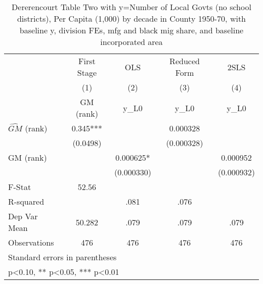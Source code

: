 \begin{table}[htbp]\centering
\def\sym#1{\ifmmode^{#1}\else\(^{#1}\)\fi}
\caption{Dererencourt Table Two with y=Number of Local Govts (no school districts), Per Capita (1,000) by decade in County 1950-70, with baseline y, division FEs, mfg and black mig share, and baseline incorporated area}
\begin{tabular}{l*{4}{c}}
\toprule
                    & First Stage   &         OLS   &Reduced Form   &        2SLS   \\
                    &\multicolumn{1}{c}{(1)}&\multicolumn{1}{c}{(2)}&\multicolumn{1}{c}{(3)}&\multicolumn{1}{c}{(4)}\\
                    &\multicolumn{1}{c}{GM  (rank)}&\multicolumn{1}{c}{y\_L0}&\multicolumn{1}{c}{y\_L0}&\multicolumn{1}{c}{y\_L0}\\
\midrule
$\hat{GM}$ (rank)   &       0.345***&               &    0.000328   &               \\
                    &    (0.0498)   &               &  (0.000328)   &               \\
\addlinespace
GM  (rank)          &               &    0.000625*  &               &    0.000952   \\
                    &               &  (0.000330)   &               &  (0.000932)   \\
\midrule
F-Stat              &       52.56   &               &               &               \\
R-squared           &               &        .081   &        .076   &               \\
Dep Var Mean        &      50.282   &        .079   &        .079   &        .079   \\
Observations        &         476   &         476   &         476   &         476   \\
\bottomrule
\multicolumn{5}{l}{\footnotesize Standard errors in parentheses}\\
\multicolumn{5}{l}{\footnotesize * p<0.10, ** p<0.05, *** p<0.01}\\
\end{tabular}
\end{table}
